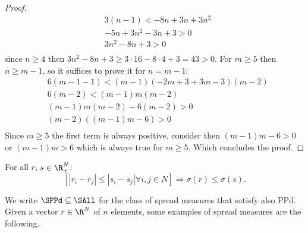 \begin{proof}
\begin{align*}
		&3(n-1)<-8n+3n+3n^2\\
		&-5n+3n^2-3n+3>0\\
		&3n^2-8n+3>0\\
	\end{align*}
	since $n\geq4$ then $3n^2-8n+3\geq 3 \cdot 16 - 8 \cdot 4+3 =43 > 0$.
	For $m\geq5$ then $n\geq m-1$, so it suffices to prove it for $n=m-1$:
	\begin{align*}
		&6(m-1-1)<(m-1)(-2m+3+3m-3)(m-2)\\
		&6(m-2)<(m-1)m(m-2)\\
		&(m-1)m(m-2)-6(m-2)>0\\
		&(m-2)((m-1)m-6)>0\\
	\end{align*}
	Since $m\geq5$ the first term is always positive, consider then $(m-1)m-6>0$ or $(m-1)m>6$ which is always true for $m\geq5$. Which concludes the proof.
\end{proof}

\begin{definition}
	\label{def:PPD}
	For all $r$, $s\in \R_{+}^{N}$: 
	\[\left[\left\vert r_{i}-r_{j}\right\vert \leq \left\vert s_{i}-s_{j}\right\vert \forall i, j\in N\right] ⇒ \sigma (r)\leq \sigma (s).\] 
\end{definition}
We write $\SPPd \subseteq \SAll$ for the class of spread measures that satisfy also PPd.
Given a vector $r \in \R^N$ of $n$ elements, some examples of spread measures are the following.
